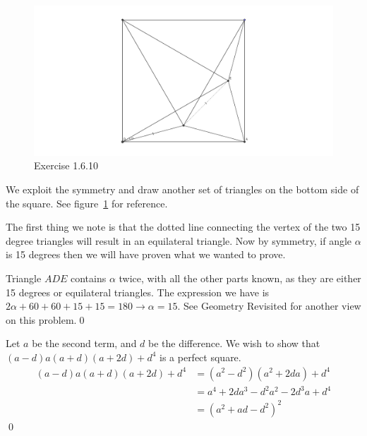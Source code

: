 \begin{Exercise}
	
\end{Exercise}

\begin{Exercise}
	
\end{Exercise}

\begin{figure}
	\centering
	\includegraphics[width=1\textwidth]{./figures/chpt1/1_6_10.png}
	\caption{Exercise 1.6.10}
	\label{fig:1_6_10}
\end{figure}		

\begin{Exercise}
	We exploit the symmetry and draw another set of triangles on the bottom side of the square.
	See figure~\ref{fig:1_6_10} for reference.

	The first thing we note is that the dotted line connecting the vertex of the two 15 degree triangles will result in an equilateral triangle.
	Now by symmetry, if angle $\alpha$ is 15 degrees then we will have proven what we wanted to prove. 

	Triangle $ADE$ contains $\alpha$ twice, with all the other parts known, as they are either 15 degrees or equilateral triangles.
	The expression we have is $2\alpha + 60 + 60 + 15 + 15 = 180 \rightarrow \alpha = 15$. 
	See Geometry Revisited for another view on this problem.\qed
\end{Exercise}

\begin{Exercise}
	Let $a$ be the second term, and $d$ be the difference. 
	We wish to show that $(a-d)a(a+d)(a+2d) + d^4$ is a perfect square.
	\begin{align*}
		(a-d)a(a+d)(a+2d) + d^4 &= (a^2 - d^2)(a^2 + 2da) + d^4 \\
		&= a^4 + 2da^3 - d^2a^2 - 2d^3a + d^4 \\
		&= (a^2 + ad - d^2)^2
	\end{align*}\qed
\end{Exercise}